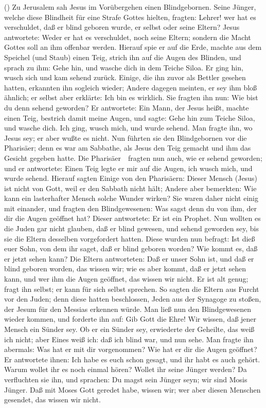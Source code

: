 \begin{aufza}\setcounter{enumi}{10}
\item {} () Zu Jerusalem sah Jesus im Vorübergehen einen Blindgebornen. Seine Jünger, welche diese Blindheit für eine Strafe Gottes hielten, fragten: Lehrer! wer hat es verschuldet, daß er blind geboren wurde, er selbst oder seine Eltern? Jesus antwortete: Weder er hat es verschuldet, noch seine Eltern; sondern die Macht Gottes soll an ihm offenbar werden. Hierauf spie er auf die Erde, machte aus dem Speichel (und Staub) einen Teig, strich ihn auf die Augen des Blinden, und sprach zu ihm: Gehe hin, und wasche dich in dem Teiche Siloa. Er ging hin, wusch sich und kam sehend zurück. Einige, die ihn zuvor als Bettler gesehen hatten, erkannten ihn sogleich wieder; Andere dagegen meinten, er sey ihm bloß ähnlich; er selbst aber erklärte: Ich bin es wirklich. Sie fragten ihn nun: Wie bist du denn sehend geworden? Er antwortete: Ein Mann, der Jesus heißt, machte einen Teig, bestrich damit meine Augen, und sagte: Gehe hin zum Teiche Siloa, und wasche dich. Ich ging, wusch mich, und wurde sehend. Man fragte ihn, wo Jesus sey; er aber wußte es nicht. Nun führten sie den Blindgebornen vor die Pharisäer; denn es war am Sabbathe, als Jesus den Teig gemacht und ihm das Gesicht gegeben hatte. Die Pharisäer~\ fragten nun auch, wie er sehend geworden; und er antwortete: Einen Teig legte er mir auf die Augen, ich wusch mich, und wurde sehend. Hierauf sagten Einige von den Pharisäern: Dieser Mensch (Jesus) ist nicht von Gott, weil er den Sabbath nicht hält; Andere aber bemerkten: Wie kann ein lasterhafter Mensch solche Wunder wirken? Sie waren daher nicht einig mit einander, und fragten den Blindgewesenen: Was sagst denn du von ihm, der dir die Augen geöffnet hat? Dieser antwortete: Er ist ein Prophet. Nun wollten es die Juden gar nicht glauben, daß er blind gewesen, und sehend geworden sey, bis sie die Eltern desselben vorgefordert hatten. Diese wurden nun befragt: Ist dieß euer Sohn, von dem ihr saget, daß er blind geboren worden? Wie kommt es, daß er jetzt sehen kann? Die Eltern antworteten: Daß er unser Sohn ist, und daß er blind geboren worden, das wissen wir; wie es aber kommt, daß er jetzt sehen kann, und wer ihm die Augen geöffnet, das wissen wir nicht. Er ist alt genug; fragt ihn selbst; er kann für sich selbst sprechen. So sagten die Eltern aus Furcht vor den Juden; denn diese hatten beschlossen, Jeden aus der Synagoge zu stoßen, der Jesum für den Messias erkennen würde. Man ließ nun den Blindgewesenen wieder kommen, und forderte ihn auf: Gib Gott die Ehre! Wir wissen, daß jener Mensch ein Sünder sey. Ob er ein Sünder sey, erwiederte der Geheilte, das weiß ich nicht; aber Eines weiß ich: daß ich blind war, und nun sehe. Man fragte ihn abermals: Was hat er mit dir vorgenommen? Wie hat er dir die Augen geöffnet? Er antwortete ihnen: Ich habe es euch schon gesagt, und ihr habt es auch gehört. Warum wollet ihr es noch einmal hören? Wollet ihr seine Jünger werden? Da verfluchten sie ihn, und sprachen: Du magst sein Jünger seyn; wir sind Mosis Jünger. Daß mit Moses Gott geredet habe, wissen wir; wer aber diesen Menschen gesendet, das wissen wir nicht. 
\end{aufza}
